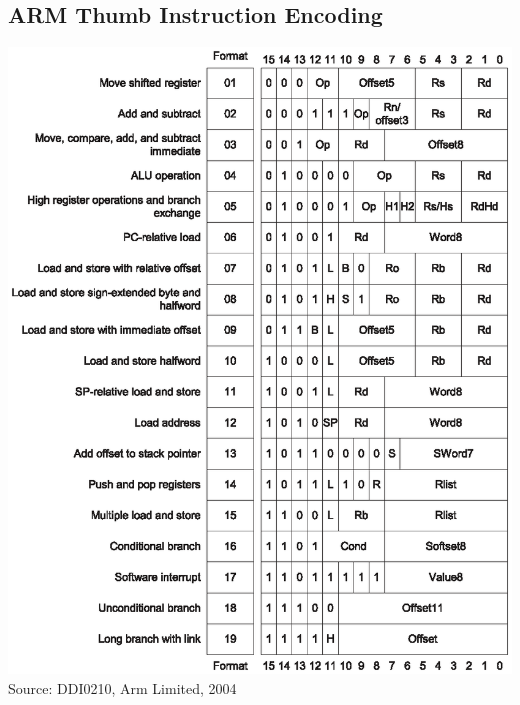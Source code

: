 \documentclass[12pt]{article}
\begin{document}
\subsection{ARM Thumb Instruction Encoding}
\vspace{0.5cm}
\includegraphics[width=\textwidth]{insencoding.eps}
Source: DDI0210, Arm Limited, 2004

\newpage
\end{document}
